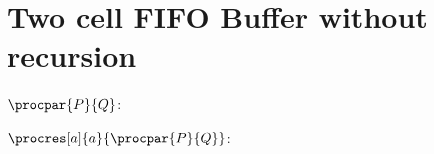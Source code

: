 \section{Two cell FIFO Buffer without recursion}
\allowdisplaybreaks
$\procpar{P}{Q}$:



$\procres[a]{a}{\procpar{P}{Q}}$:



